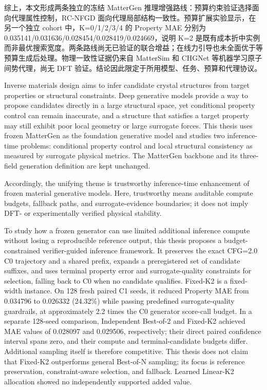 \begin{ChineseAbstract}
综上，本文形成两条独立的冻结 MatterGen 推理增强路线：预算约束验证选择面向代理属性控制，RC-NFGD 面向代理局部结构一致性。预算扩展实验显示，在另一个独立 cohort 中，K=0/1/2/3/4 的 Property MAE 分别为 0.035141/0.031636/0.028454/0.028419/0.024669，说明 K=2 是既有成本折中实例而非最优搜索宽度。两条路线尚无已验证的联合增益；在线力引导也未全面优于等预算生成后处理。物理一致性证据仍来自 MatterSim 和 CHGNet 等机器学习原子间势代理，尚无 DFT 验证。结论因此限定于所用模型、任务、预算和代理协议。

\end{ChineseAbstract}

\begin{EnglishAbstract}

Inverse materials design aims to infer candidate crystal structures from target properties or structural constraints. Deep generative models provide a way to propose candidates directly in a large structural space, yet conditional property control can remain inaccurate, and a structure that satisfies a target property may still exhibit poor local geometry or large surrogate forces. This thesis uses frozen MatterGen as the foundation generative model and studies two inference-time problems: conditional property control and local structural consistency as measured by surrogate physical metrics. The MatterGen backbone and its three-field generation definition are kept unchanged.

Accordingly, the unifying theme is trustworthy inference-time enhancement of frozen material generative models. Here, trustworthy means auditable compute budgets, fallback paths, and surrogate-evidence boundaries; it does not imply DFT- or experimentally verified physical stability.


To study how a frozen generator can use limited additional inference compute without losing a reproducible reference output, this thesis proposes a budget-constrained verifier-guided inference framework. It preserves the exact CFG=2.0 C0 trajectory and a shared prefix, expands a preregistered set of candidate suffixes, and uses terminal property error and surrogate-quality constraints for selection, falling back to C0 when no candidate qualifies. Fixed-K2 is a fixed-width instance. On 128 fresh paired C1 seeds, it reduced Property MAE from 0.034796 to 0.026332 (24.32\%) while passing predefined surrogate-quality guardrails, at approximately 2.2 times the C0 generator score-call budget. In a separate 128-seed comparison, Independent Best-of-2 and Fixed-K2 achieved MAE values of 0.028097 and 0.029506, respectively; their direct paired confidence interval spans zero, and their compute and terminal-candidate budgets differ. Additional sampling itself is therefore competitive. This thesis does not claim that Fixed-K2 outperforms general Best-of-N sampling; its focus is reference preservation, constraint-aware selection, and fallback. Learned Linear-K2 allocation showed no independently supported added value.


\end{EnglishAbstract}
